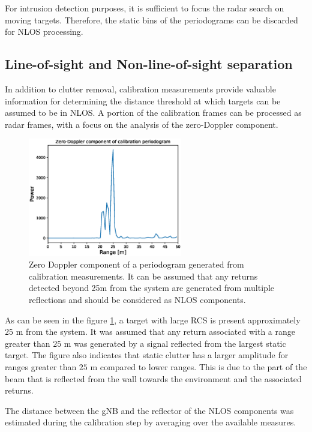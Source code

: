 	For intrusion detection purposes, it is sufficient to focus the radar search on moving targets. 
	Therefore, the static bins of the periodograms can be discarded for NLOS processing.
	
	\subsection{Line-of-sight and Non-line-of-sight separation}
	
	
	
	In addition to clutter removal, calibration measurements provide valuable information for determining the distance threshold at which targets can be assumed to be in NLOS. 
	A portion of the calibration frames can be processed as radar frames, with a focus on the analysis of the zero-Doppler component.
	
	
	\begin{figure}[H]
		\centering
		\includegraphics[width=0.6\textwidth]{Images/Test1/cali_static_per_t1.eps}
		\caption{Zero Doppler component of a periodogram generated from calibration measurements. It can be assumed that any returns detected beyond 25m from the system are generated from multiple reflections and should be considered as NLOS components. }
		\label{fig:Test1_cali_static_per}
	\end{figure}
	
	As can be seen in the figure \ref{fig:Test1_cali_static_per}, a target with large RCS is present approximately $25$ m from the system. It was assumed that any return associated with a range greater than $25$ m was generated by a signal reflected from the largest static target. The figure also indicates that static clutter has a larger amplitude for ranges greater than $25$ m compared to lower ranges. This is due to the part of the beam that is reflected from the wall towards the environment and the associated returns.
	
	The distance between the gNB and the reflector of the NLOS components was estimated during the calibration step by averaging over the available measures.
	
